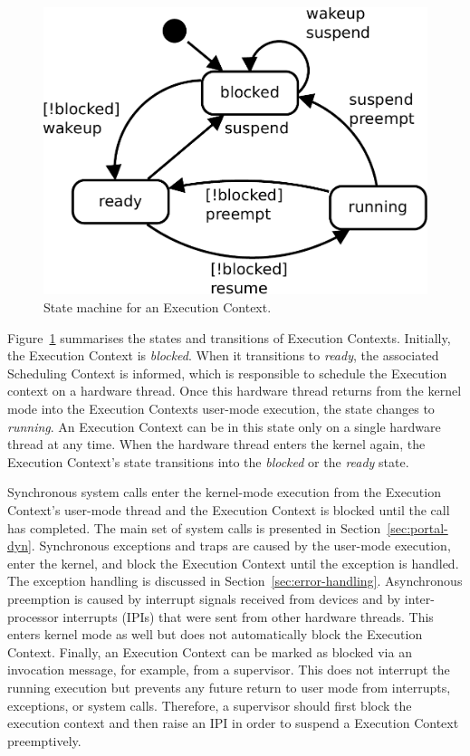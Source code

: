 \begin{figure}
\begin{center}
\includegraphics[scale=0.25]{fig/ExecutionContext.pdf}
\caption{State machine for an Execution Context.}
\label{fig:portal:state}
\end{center}
\end{figure}

Figure~\ref{fig:portal:state} summarises the states and transitions of Execution Contexts. Initially, the Execution Context is \emph{blocked}. When it transitions to \emph{ready}, the associated Scheduling Context is informed, which is responsible to schedule the Execution context on a hardware thread. Once this hardware thread returns from the kernel mode into the Execution Contexts user-mode execution, the state changes to \emph{running}. An Execution Context can be in this state only on a single hardware thread at any time. When the hardware thread enters the kernel again, the Execution Context's state transitions into the \emph{blocked} or the \emph{ready} state.

Synchronous system calls enter the kernel-mode execution from the Execution Context's user-mode thread and the Execution Context is blocked until the call has completed. The main set of system calls is presented in Section~\ref{sec:portal-dyn}.
Synchronous exceptions and traps are caused by the user-mode execution, enter the kernel, and block the Execution Context until the exception is handled. The exception handling is discussed in Section~\ref{sec:error-handling}.
Asynchronous preemption is caused by interrupt signals received from devices and by inter-processor interrupts (IPIs) that were sent from other hardware threads. This enters kernel mode as well but does not automatically block the Execution Context. 
Finally, an Execution Context can be marked as blocked via an invocation message, for example, from a supervisor. This does not interrupt the running execution but prevents any future return to user mode from interrupts, exceptions, or system calls.  Therefore, a supervisor should first block the execution context and then raise an IPI in order to suspend a Execution Context preemptively.

